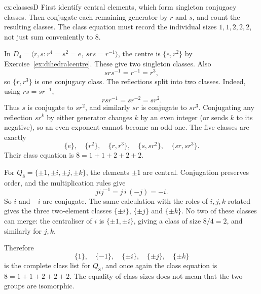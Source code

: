 \begin{solution}{ex:classesD}
\idea First identify central elements, which form singleton conjugacy classes. Then conjugate each remaining generator by $r$ and $s$, and count the resulting classes. The class equation must record the individual sizes $1,1,2,2,2$, not just sum conveniently to $8$.

\writeup In $D_4=\langle r,s:r^4=s^2=e,\ srs=r^{-1}\rangle$, the centre is $\{e,r^2\}$ by Exercise~\ref{ex:dihedralcentre}. These give two singleton classes. Also
\[
srs^{-1}=r^{-1}=r^3,
\]
so $\{r,r^3\}$ is one conjugacy class. The reflections split into two classes. Indeed, using $rs=sr^{-1}$,
\[
rsr^{-1}=sr^{-2}=sr^2.
\]
Thus $s$ is conjugate to $sr^2$, and similarly $sr$ is conjugate to $sr^3$. Conjugating any reflection $sr^k$ by either generator changes $k$ by an even integer (or sends $k$ to its negative), so an even exponent cannot become an odd one. The five classes are exactly
\[
\boxed{\{e\},\quad\{r^2\},\quad\{r,r^3\},
       \quad\{s,sr^2\},\quad\{sr,sr^3\}}.
\]
Their class equation is $8=1+1+2+2+2$.

For $Q_8=\{\pm1,\pm i,\pm j,\pm k\}$, the elements $\pm1$ are central. Conjugation preserves order, and the multiplication rules give
\[
jij^{-1}=j\,i\,(-j)=-i.
\]
So $i$ and $-i$ are conjugate. The same calculation with the roles of $i,j,k$ rotated gives the three two-element classes $\{\pm i\}$, $\{\pm j\}$ and $\{\pm k\}$. No two of these classes can merge: the centraliser of $i$ is $\{\pm1,\pm i\}$, giving a class of size $8/4=2$, and similarly for $j,k$.

Therefore
\[
\boxed{\{1\},\quad\{-1\},\quad\{\pm i\},
       \quad\{\pm j\},\quad\{\pm k\}}
\]
is the complete class list for $Q_8$, and once again the class equation is $8=1+1+2+2+2$. The equality of class sizes does not mean that the two groups are isomorphic.
\end{solution}

